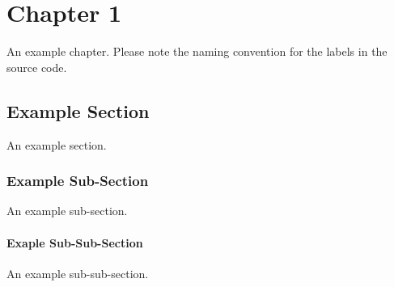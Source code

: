 \chapter{Chapter 1}
\label{ch.chapter1}

An example chapter. Please note the naming convention for the labels in the source code.

\section{Example Section}
\label{sc.example}

An example section.

\subsection{Example Sub-Section}
\label{sc.example.sub}

An example sub-section.

\subsubsection{Exaple Sub-Sub-Section}
\label{sc.example.sub.sub_sub}

An example sub-sub-section.
